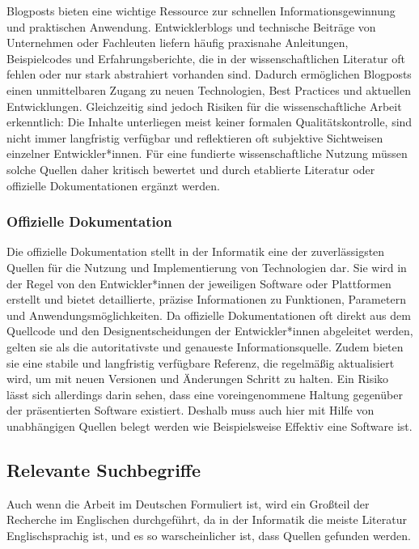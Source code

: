 Blogposts bieten eine wichtige Ressource zur schnellen Informationsgewinnung und praktischen Anwendung. 
Entwicklerblogs und technische Beiträge von Unternehmen oder Fachleuten liefern häufig praxisnahe Anleitungen,
Beispielcodes und Erfahrungsberichte, die in der wissenschaftlichen Literatur oft fehlen oder nur stark abstrahiert vorhanden sind. 
Dadurch ermöglichen Blogposts einen unmittelbaren Zugang zu neuen Technologien, Best Practices und aktuellen Entwicklungen.
Gleichzeitig sind jedoch Risiken für die wissenschaftliche Arbeit erkenntlich:
Die Inhalte unterliegen meist keiner formalen Qualitätskontrolle, sind nicht immer langfristig verfügbar und 
reflektieren oft subjektive Sichtweisen einzelner Entwickler*innen.
Für eine fundierte wissenschaftliche Nutzung müssen solche Quellen daher kritisch bewertet und 
durch etablierte Literatur oder offizielle Dokumentationen ergänzt werden.

\subsubsection{Offizielle Dokumentation}

Die offizielle Dokumentation stellt in der Informatik eine der zuverlässigsten Quellen für die Nutzung und Implementierung 
von Technologien dar.
Sie wird in der Regel von den Entwickler*innen der jeweiligen Software oder Plattformen erstellt und bietet detaillierte, 
präzise Informationen zu Funktionen, Parametern und Anwendungsmöglichkeiten. 
Da offizielle Dokumentationen oft direkt aus dem Quellcode und den Designentscheidungen der Entwickler*innen abgeleitet werden, 
gelten sie als die autoritativste und genaueste Informationsquelle.
Zudem bieten sie eine stabile und langfristig verfügbare Referenz,
die regelmäßig aktualisiert wird, um mit neuen Versionen und Änderungen Schritt zu halten.
Ein Risiko lässt sich allerdings darin sehen, dass eine voreingenommene Haltung gegenüber der präsentierten Software existiert.
Deshalb muss auch hier mit Hilfe von unabhängigen Quellen belegt werden wie Beispielsweise Effektiv eine Software ist.

\subsection{Relevante Suchbegriffe}

Auch wenn die Arbeit im Deutschen Formuliert ist, wird ein Großteil der Recherche im Englischen
durchgeführt, da in der Informatik die meiste Literatur Englischsprachig ist, und es so warscheinlicher ist,
dass Quellen gefunden werden.

